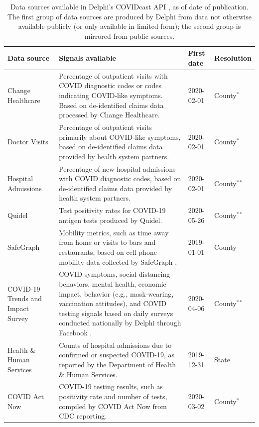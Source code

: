 \documentclass[9pt,twocolumn,twoside,lineno]{pnas-new}
\begin{document}
\begin{table}[t]
\centering
\caption{Data sources available in Delphi's COVIDcast API \cite{CovidcastAPI},
  as of date of publication. The first group of data sources are produced by
  Delphi from data not otherwise available publicly (or only available in
  limited form); the second group is mirrored from public sources.}
\begin{tabular}{>{\raggedright}p{1.2in} p{4.0in} l >{\raggedright\arraybackslash}p{0.5in}}
  \toprule
  \textbf{Data source} & \textbf{Signals available} & \textbf{First date} &
\textbf{Resolution} \\\midrule
  Change Healthcare & Percentage of outpatient visits with COVID diagnostic
codes or codes indicating COVID-like symptoms. Based on de-identified claims
data processed by Change Healthcare. & 2020-02-01 & County$^*$ \\
  Doctor Visits & Percentage of outpatient visits primarily about COVID-like
symptoms, based on de-identified claims data provided by health system
partners. & 2020-02-01 & County$^*$ \\
  Hospital Admissions & Percentage of new hospital admissions with COVID
diagnostic codes, based on de-identified claims data provided by health system
partners. & 2020-02-01 & County$^{**}$\\
  Quidel & Test positivity rates for COVID-19 antigen tests produced by
Quidel. & 2020-05-26 & County$^{**}$ \\
  SafeGraph & Mobility metrics, such as time away from home or visits to bars
and restaurants, based on cell phone mobility data collected by SafeGraph
\cite{SafeGraphSocial, SafeGraphPatterns}. & 2019-01-01 & County \\
  COVID-19 Trends and Impact Survey & COVID symptoms, social distancing
behaviors, mental health, economic impact, behavior (e.g., mask-wearing,
vaccination attitudes), and COVID testing signals based on daily surveys
conducted nationally by Delphi through Facebook \cite{DelphiSurvey,
Kreuter:2020}. & 2020-04-06 & County$^{**}$ \\
  \midrule
  Health \& Human Services & Counts of hospital admissions due to confirmed or
suspected COVID-19, as reported by the Department of Health \& Human Services. &
2019-12-31 & State \\
  COVID Act Now & COVID-19 testing results, such as positivity rate and number
of tests, compiled by COVID Act Now from CDC reporting. & 2020-03-02 &
County$^*$ \\

\end{tabular}
\end{table}
\end{document}
